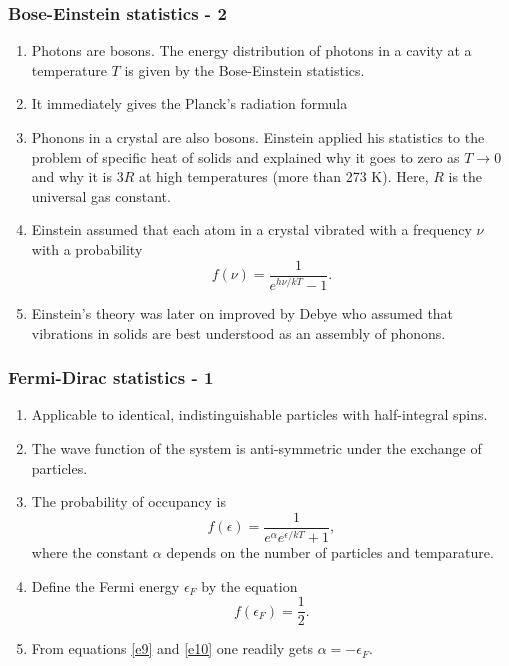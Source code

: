 \documentclass{beamer}
\begin{document}
\begin{frame}
\frametitle{Bose-Einstein statistics - 2}
\begin{enumerate}
\item Photons are bosons. The energy distribution of photons in a cavity at a
temperature $T$ is given by the Bose-Einstein statistics. 
\item It immediately gives the Planck's radiation formula
\item Phonons in a crystal are also bosons. Einstein applied his statistics to 
the problem of specific heat of solids and explained why it goes to zero as
$T \rightarrow 0$ and why it is $3R$ at high temperatures (more than 273 K).
Here, $R$ is the universal gas constant.
\item Einstein assumed that each atom in a crystal vibrated with a frequency
$\nu$ with a probability
\begin{equation}\label{e8}
f(\nu) = \frac{1}{e^{h\nu/kT} - 1}.
\end{equation}
\item Einstein's theory was later on improved by Debye who assumed that 
vibrations in solids are best understood as an assembly of phonons.
\end{enumerate}
\end{frame}

\begin{frame}
\frametitle{Fermi-Dirac statistics - 1}
\begin{enumerate}
\item Applicable to identical, indistinguishable particles with half-integral 
spins.
\item The wave function of the system is anti-symmetric under the exchange of 
particles.
\item The probability of occupancy is
\begin{equation}\label{e9}
f(\epsilon) = \frac{1}{e^\alpha e^{\epsilon/kT} + 1},
\end{equation}
where the constant $\alpha$ depends on the number of particles and temparature.
\item Define the Fermi energy $\epsilon_F$ by the equation
\begin{equation}\label{e10}
f(\epsilon_F) = \frac{1}{2}.
\end{equation}
\item From equations \eqref{e9} and \eqref{e10} one readily gets $\alpha = 
-\epsilon_F$.
\end{enumerate}
\end{frame}
\end{document}
